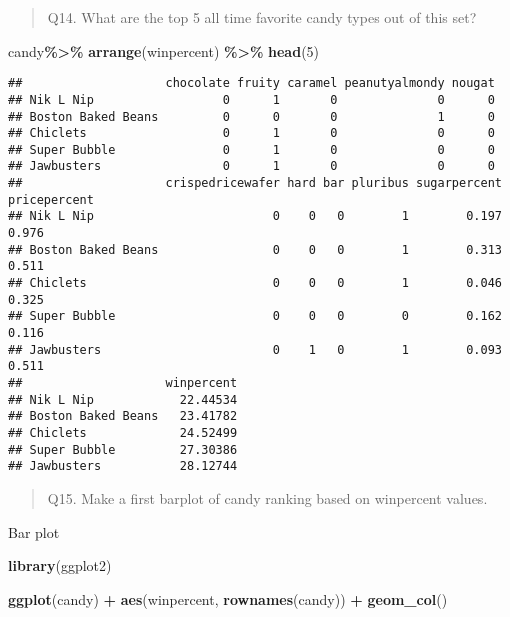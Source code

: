\documentclass[
]{article}
\newenvironment{Shaded}{\begin{snugshade}}{\end{snugshade}}
\newcommand{\DecValTok}[1]{\textcolor[rgb]{0.00,0.00,0.81}{#1}}
\newcommand{\FunctionTok}[1]{\textcolor[rgb]{0.13,0.29,0.53}{\textbf{#1}}}
\newcommand{\NormalTok}[1]{#1}
\newcommand{\SpecialCharTok}[1]{\textcolor[rgb]{0.81,0.36,0.00}{\textbf{#1}}}
\begin{document}
\begin{quote}
Q14. What are the top 5 all time favorite candy types out of this set?
\end{quote}

\begin{Shaded}
\begin{Highlighting}[]
\NormalTok{candy}\SpecialCharTok{\%\textgreater{}\%}
  \FunctionTok{arrange}\NormalTok{(winpercent) }\SpecialCharTok{\%\textgreater{}\%} \FunctionTok{head}\NormalTok{(}\DecValTok{5}\NormalTok{)}
\end{Highlighting}
\end{Shaded}

\begin{verbatim}
##                    chocolate fruity caramel peanutyalmondy nougat
## Nik L Nip                  0      1       0              0      0
## Boston Baked Beans         0      0       0              1      0
## Chiclets                   0      1       0              0      0
## Super Bubble               0      1       0              0      0
## Jawbusters                 0      1       0              0      0
##                    crispedricewafer hard bar pluribus sugarpercent pricepercent
## Nik L Nip                         0    0   0        1        0.197        0.976
## Boston Baked Beans                0    0   0        1        0.313        0.511
## Chiclets                          0    0   0        1        0.046        0.325
## Super Bubble                      0    0   0        0        0.162        0.116
## Jawbusters                        0    1   0        1        0.093        0.511
##                    winpercent
## Nik L Nip            22.44534
## Boston Baked Beans   23.41782
## Chiclets             24.52499
## Super Bubble         27.30386
## Jawbusters           28.12744
\end{verbatim}

\begin{quote}
Q15. Make a first barplot of candy ranking based on winpercent values.
\end{quote}

Bar plot

\begin{Shaded}
\begin{Highlighting}[]
\FunctionTok{library}\NormalTok{(ggplot2)}

\FunctionTok{ggplot}\NormalTok{(candy) }\SpecialCharTok{+}
  \FunctionTok{aes}\NormalTok{(winpercent, }\FunctionTok{rownames}\NormalTok{(candy)) }\SpecialCharTok{+}
  \FunctionTok{geom\_col}\NormalTok{()}
\end{Highlighting}
\end{Shaded}
\end{document}
